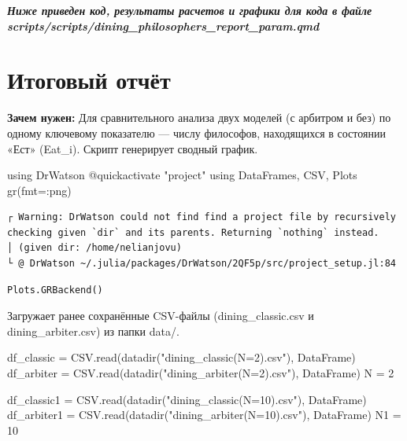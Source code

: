 \documentclass[
  12pt,
  a4paper,
  DIV=11,
  numbers=noendperiod]{scrreprt}
\newenvironment{Shaded}{\begin{snugshade}}{\end{snugshade}}
\newcommand{\BuiltInTok}[1]{\textcolor[rgb]{0.00,0.23,0.31}{#1}}
\newcommand{\FloatTok}[1]{\textcolor[rgb]{0.68,0.00,0.00}{#1}}
\newcommand{\FunctionTok}[1]{\textcolor[rgb]{0.28,0.35,0.67}{#1}}
\newcommand{\ImportTok}[1]{\textcolor[rgb]{0.00,0.46,0.62}{#1}}
\newcommand{\NormalTok}[1]{\textcolor[rgb]{0.00,0.23,0.31}{#1}}
\newcommand{\OperatorTok}[1]{\textcolor[rgb]{0.37,0.37,0.37}{#1}}
\newcommand{\PreprocessorTok}[1]{\textcolor[rgb]{0.68,0.00,0.00}{#1}}
\newcommand{\StringTok}[1]{\textcolor[rgb]{0.13,0.47,0.30}{#1}}
\begin{document}
\textbf{\emph{Ниже приведен код, результаты расчетов и графики для кода
в файле scripts/scripts/dining\_philosophers\_report\_param.qmd}}

\section{Итоговый
отчёт}\label{ux438ux442ux43eux433ux43eux432ux44bux439-ux43eux442ux447ux451ux442-2}

\textbf{Зачем нужен:} Для сравнительного анализа двух моделей (с
арбитром и без) по одному ключевому показателю --- числу философов,
находящихся в состоянии «Ест» (Eat\_i). Скрипт генерирует сводный
график.

\begin{Shaded}
\begin{Highlighting}[]
\ImportTok{using} \BuiltInTok{DrWatson}
\PreprocessorTok{@quickactivate} \StringTok{"project"}
\ImportTok{using} \BuiltInTok{DataFrames}\NormalTok{, }\BuiltInTok{CSV}\NormalTok{, }\BuiltInTok{Plots}
\FunctionTok{gr}\NormalTok{(fmt}\OperatorTok{=:}\NormalTok{png)}
\end{Highlighting}
\end{Shaded}

\begin{verbatim}
┌ Warning: DrWatson could not find find a project file by recursively checking given `dir` and its parents. Returning `nothing` instead.
│ (given dir: /home/nelianjovu)
└ @ DrWatson ~/.julia/packages/DrWatson/2QF5p/src/project_setup.jl:84
\end{verbatim}

\begin{verbatim}
Plots.GRBackend()
\end{verbatim}

Загружает ранее сохранённые CSV-файлы (dining\_classic.csv и
dining\_arbiter.csv) из папки data/.

\begin{Shaded}
\begin{Highlighting}[]
\NormalTok{df\_classic }\OperatorTok{=}\NormalTok{ CSV.}\FunctionTok{read}\NormalTok{(}\FunctionTok{datadir}\NormalTok{(}\StringTok{"dining\_classic(N=2).csv"}\NormalTok{), DataFrame)}
\NormalTok{df\_arbiter }\OperatorTok{=}\NormalTok{ CSV.}\FunctionTok{read}\NormalTok{(}\FunctionTok{datadir}\NormalTok{(}\StringTok{"dining\_arbiter(N=2).csv"}\NormalTok{), DataFrame)}
\NormalTok{N }\OperatorTok{=} \FloatTok{2}

\NormalTok{df\_classic1 }\OperatorTok{=}\NormalTok{ CSV.}\FunctionTok{read}\NormalTok{(}\FunctionTok{datadir}\NormalTok{(}\StringTok{"dining\_classic(N=10).csv"}\NormalTok{), DataFrame)}
\NormalTok{df\_arbiter1 }\OperatorTok{=}\NormalTok{ CSV.}\FunctionTok{read}\NormalTok{(}\FunctionTok{datadir}\NormalTok{(}\StringTok{"dining\_arbiter(N=10).csv"}\NormalTok{), DataFrame)}
\NormalTok{N1 }\OperatorTok{=} \FloatTok{10}
\end{Highlighting}
\end{Shaded}
\end{document}
